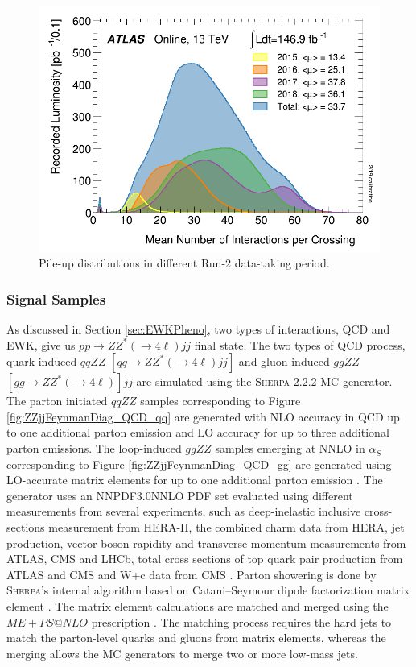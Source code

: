 \begin{figure}[!htbp]
  \centering
  \includegraphics[width=.8\linewidth]{figures/AnalysisOverview/mu_ProfileRun2.pdf}
  \caption{Pile-up distributions in different Run-2 data-taking period.\label{fig:PileupDiffRuns} \cite{ATLASRun2DataTaking}}
\end{figure}

\subsubsection{Signal Samples}
\label{subsubsec:SigSamples}
As discussed in Section \ref{sec:EWKPheno}, two types of interactions, QCD and EWK, give us $pp \rightarrow ZZ^*(\rightarrow 4 \ell) jj$ final state. The two types of QCD process, quark induced $qqZZ$ $[qq \rightarrow ZZ^*(\rightarrow 4 \ell) jj]$ and gluon induced $ggZZ$ $[gg \rightarrow ZZ^* (\rightarrow 4\ell) ]jj$ are simulated using the \textsc{Sherpa} $2.2.2$ MC generator. The parton initiated $qqZZ$ samples corresponding to Figure \ref{fig:ZZjjFeynmanDiag_QCD_qq} are generated with NLO accuracy in QCD up to one additional parton emission and LO accuracy for up to three additional parton emissions. The loop-induced $ggZZ$ samples emerging at NNLO in $\alpha_{S}$ corresponding to Figure \ref{fig:ZZjjFeynmanDiag_QCD_gg} are generated using LO-accurate matrix elements for up to one additional parton emission \cite{EventGenWithSherpa}. The generator uses an NNPDF3.0NNLO PDF set evaluated using different measurements from several experiments, such as deep-inelastic inclusive cross-sections measurement from HERA-II, the combined charm data from HERA, jet production, vector boson rapidity and transverse momentum measurements from ATLAS, CMS and LHCb, total cross sections of top quark pair production from ATLAS and CMS and W+c data from CMS \cite{PDFForRunII}. Parton showering is done by \textsc{Sherpa}'s internal algorithm based on Catani–Seymour dipole factorization matrix element \cite{SherpaPS}. The matrix element calculations are matched and merged using the $ME+PS@NLO$ prescription \cite{PSMatching}. The matching process requires the hard jets to match the parton-level quarks and gluons from matrix elements, whereas the merging allows the MC generators to merge two or more low-mass jets. 

